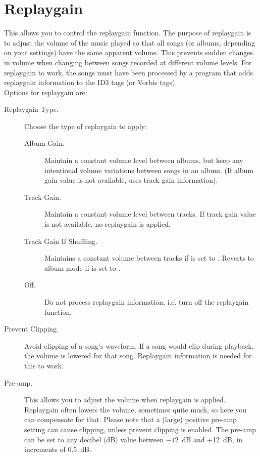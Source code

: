 \section{\label{ref:ReplayGain}Replaygain}
  This allows you to control the replaygain function.
  The purpose of replaygain is to adjust the volume of the music played
  so that all songs (or albums, depending on your settings) have the
  same apparent volume. This prevents sudden changes in volume when
  changing between songs recorded at different volume levels.
  For replaygain to work, the songs must have been processed by a program
  that adds replaygain information to the ID3 tags (or Vorbis tags).\\
      
  Options for replaygain are:
  \begin{description}
    \item[Replaygain Type.] Choose the type of replaygain to apply:
      \begin{description}
      \item[Album Gain.] Maintain a constant volume level between
        albums, but keep any intentional volume variations between 
        songs in an album. (If album gain value is not available,
        uses track gain information).
      \item[Track Gain.] Maintain a constant volume level between
        tracks. If track gain value is not available, no replaygain 
        is applied.
      \item[Track Gain If Shuffling.] Maintains a constant volume
        between tracks if  is set to .
        Reverts to album mode if  is set to .
      \item[Off.] Do not process replaygain information, i.e. turn off
        the replaygain function.
      \end{description}
    \item[Prevent Clipping.] Avoid clipping of a song's waveform.
      If a song would clip during playback, the volume is lowered for 
      that song. Replaygain information is needed for this to work.
    \item[Pre-amp.] This allows you to adjust the volume when replaygain
      is applied. Replaygain often lowers the volume, sometimes quite
      much, so here you can compensate for that. Please note that a
      (large) positive pre-amp setting can cause clipping, unless
      prevent clipping is enabled.  The pre-amp can be set to any
      decibel (dB) value between $-12$~dB and +12~dB, in increments of 0.5~dB.
    \end{description}

